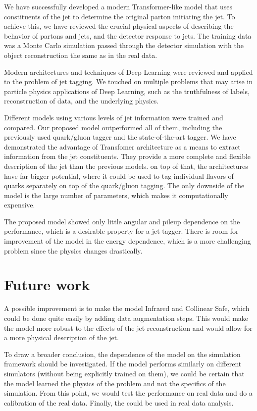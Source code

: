 

We have successfully developed a modern Transformer-like model that uses constituents of the jet to determine the original parton initiating the jet.
To achieve this, we have reviewed the crucial physical aspects of \QCD describing the behavior of partons and jets, and the detector response to jets.
The training data was a Monte Carlo simulation passed through the detector simulation with the object reconstruction the same as in the real data.  

Modern architectures and techniques of Deep Learning were reviewed and applied to the problem of jet tagging.
We touched on multiple problems that may arise in particle physics applications of Deep Learning, such as the truthfulness of labels, reconstruction of data, and the underlying physics.

Different models using various levels of jet information were trained and compared.
Our proposed \depart model outperformed all of them, including the previously used quark/gluon tagger and the state-of-the-art \ParT tagger.
We have demonstrated the advantage of Transfomer architecture as a means to extract information from the jet constituents.
They provide a more complete and flexible description of the jet than the previous models.
on top of that, the \trans architectures have far bigger potential, where it could be used to tag individual flavors of quarks separately on top of the quark/gluon tagging. 
The only downside of the model is the large number of parameters, which makes it computationally expensive.

The proposed model showed only little angular and pileup dependence on the performance, which is a desirable property for a jet tagger. 
There is room for improvement of the model in the energy dependence, which is a more challenging problem since the physics changes drastically.

\section{Future work}
A possible improvement is to make the model Infrared and Collinear Safe, which could be done quite easily by adding data augmentation steps. 
This would make the model more robust to the effects of the jet reconstruction and would allow for a more physical description of the jet.

To draw a broader conclusion, the dependence of the model on the simulation framework should be investigated.
If the model performs similarly on different simulators (without being explicitly trained on them), we could be certain that the model learned the physics of the problem and not the specifics of the simulation. 
From this point, we would test the performance on real data and do a calibration of the real data.
Finally, the \depart could be used in real data analysis.